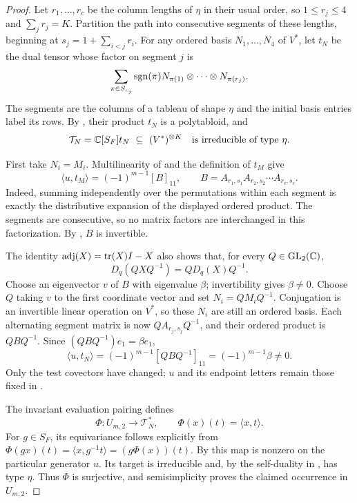 \begin{proof}
Let $r_1,\ldots,r_c$ be the column lengths of $\eta$ in their usual order,
so $1\leq r_j\leq4$ and $\sum_jr_j=K$. Partition the path into consecutive
segments of these lengths, beginning at
$s_j=1+\sum_{i<j}r_i$.
For any ordered basis $N_1,\ldots,N_4$ of $V^*$, let $t_N$ be the dual
tensor whose factor on segment $j$ is
\[
 \sum_{\pi\in S_{r_j}}\operatorname{sgn}(\pi)
       N_{\pi(1)}\otimes\cdots\otimes N_{\pi(r_j)}.
\]
The segments are the columns of a tableau of shape $\eta$ and the initial
basis entries label its rows. By , their product
$t_N$ is a polytabloid, and
\[
 \mathcal T_N=\mathbb C[S_F]t_N\ \subseteq\ (V^*)^{\otimes K}
 \quad\text{is irreducible of type }\eta.
\]

First take $N_i=M_i$. Multilinearity of
 and the definition of $t_M$ give
\begin{equation}\label{path:ordered-factorization}
 \langle u,t_M\rangle=(-1)^{m-1}[B]_{11},\qquad
 B=A_{r_1,s_1}A_{r_2,s_2}\cdots A_{r_c,s_c}.
\end{equation}
Indeed, summing independently over the permutations within each segment
is exactly the distributive expansion of the displayed ordered product.
The segments are consecutive, so no matrix factors are interchanged in
this factorization. By , $B$ is invertible.

The identity $\operatorname{adj}(X)=\operatorname{tr}(X)I-X$ also shows that, for every
$Q\in\operatorname{GL}_2(\mathbb C)$,
\[
 D_q(QXQ^{-1})=QD_q(X)Q^{-1}.
\]
Choose an eigenvector $v$ of $B$ with eigenvalue $\beta$; invertibility
gives $\beta\ne0$. Choose $Q$ taking $v$ to the first coordinate vector
and set $N_i=QM_iQ^{-1}$. Conjugation is an invertible linear operation
on $V^*$, so these $N_i$ are still an ordered basis. Each alternating
segment matrix is now $QA_{r_j,s_j}Q^{-1}$, and their ordered product is
$QBQ^{-1}$. Since $(QBQ^{-1})e_1=\beta e_1$,
\begin{equation}\label{path:nonzero-pairing}
 \langle u,t_N\rangle=(-1)^{m-1}[QBQ^{-1}]_{11}
                    =(-1)^{m-1}\beta\ne0.
\end{equation}
Only the test covectors have changed; $u$ and its endpoint letters remain
those fixed in .

The invariant evaluation pairing defines
\begin{equation}\label{path:quotient-map}
 \Phi:U_{m,2}\longrightarrow\mathcal T_N^*,\qquad
 \Phi(x)(t)=\langle x,t\rangle.
\end{equation}
For $g\in S_F$, its equivariance follows explicitly from
$\Phi(gx)(t)=\langle x,g^{-1}t\rangle=(g\Phi(x))(t)$.
By  this map is nonzero on the particular
generator $u$. Its target is irreducible and, by the self-duality in
, has type $\eta$. Thus $\Phi$ is surjective, and
semisimplicity proves the claimed occurrence in $U_{m,2}$.
\end{proof}


